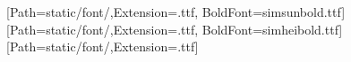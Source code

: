 


[Path=static/font/,Extension=.ttf, BoldFont=simsunbold.ttf]
\renewcommand{\songti}{\CJKfamily{simsun}}
[Path=static/font/,Extension=.ttf, BoldFont=simheibold.ttf]
\renewcommand{\heiti}{\CJKfamily{simhei}}
[Path=static/font/,Extension=.ttf]
\renewcommand{\fangsong}{\CJKfamily{simfang}}
\newcommand{\maintitle}{\fontsize{36pt}{36pt}}                %
\newcommand{\yihao}{\fontsize{26pt}{26pt}\selectfont}       %
\newcommand{\xiaoyi}{\fontsize{24pt}{24pt}\selectfont}      %
\newcommand{\erhao}{\fontsize{22pt}{1.25\baselineskip}\selectfont}       %
\newcommand{\xiaoer}{\fontsize{18pt}{18pt}\selectfont}      %
\newcommand{\sanhao}{\fontsize{16pt}{16pt}\selectfont}      %
\newcommand{\xiaosan}{\fontsize{15pt}{15pt}\selectfont}     %
\newcommand{\sihao}{\fontsize{14pt}{14pt}\selectfont}       %
\newcommand{\xiaosi}{\fontsize{12pt}{12pt}\selectfont}      %
\newcommand{\wuhao}{\fontsize{10.5pt}{10.5pt}\selectfont}   %
\newcommand{\xiaowu}{\fontsize{9pt}{9pt}\selectfont}        %
\newcommand{\xfsm}{\songti\xiaosi\setstretch{1.63}}           %
\newcommand{\xfbody}{\songti\xiaosi\setstretch{1.95}}         %
\newcommand{\xfabstract}{\fangsong\xiaosi\setstretch{1.95}}   %
\newcommand{\xfenabstract}{\fangsong\xiaosi\setstretch{1.73}} %


